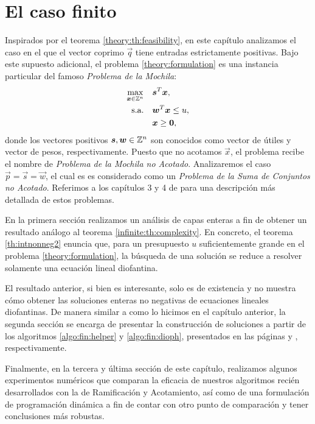 \chapter{El caso finito}
\noindent
Inspirados por el teorema \ref{theory:th:feasibility}, en este capítulo analizamos el caso en el que
el vector coprimo $\vec{q}$ tiene entradas estrictamente positivas. Bajo este supuesto adicional, el
problema \eqref{theory:formulation} es una instancia particular del famoso \emph{Problema de la
Mochila}:
\begin{subequations}
	\label{knapsack-formulation}
	\begin{align}
		\max_{\boldsymbol{x} \in \mathbb{Z}^n} \quad
			& \boldsymbol{s}^T\boldsymbol{x}, \\
		\text{s.a.} \quad
			& \boldsymbol{w}^T\boldsymbol{x} \leq u, \\
			& \boldsymbol{x} \geq \boldsymbol{0},
	\end{align}
\end{subequations}
donde los vectores positivos $\boldsymbol{s}, \boldsymbol{w} \in \mathbb{Z}^n$ son conocidos como vector de útiles y
vector de pesos, respectivamente. Puesto que no acotamos $\vec{x}$, el problema recibe el nombre de
\emph{Problema de la Mochila no Acotado}. Analizaremos el caso $\vec{p} = \vec{s} = \vec{w}$, el cual es es
considerado como un \emph{Problema de la Suma de Conjuntos no Acotado}. Referimos a los capítulos 3 y 4 de
\cite{martello} para una descripción más detallada de estos problemas.

En la primera sección realizamos un análisis de capas enteras a fin de obtener un resultado análogo
al teorema \ref{infinite:th:complexity}. En concreto, el teorema \ref{th:intnonneg2} enuncia que,
para un presupuesto $u$ suficientemente grande en el problema \eqref{theory:formulation}, la
búsqueda de una solución se reduce a resolver solamente una ecuación lineal diofantina.

El resultado anterior, si bien es interesante, solo es de existencia y no muestra cómo obtener las
soluciones enteras no negativas de ecuaciones lineales diofantinas. De manera similar a como lo
hicimos en el capítulo anterior, la segunda sección se encarga de presentar la construcción de
soluciones a partir de los algoritmos \ref{algo:fin:helper} y \ref{algo:fin:dioph}, presentados en
las páginas \pageref{algo:fin:helper} y \pageref{algo:fin:dioph}, respectivamente.

Finalmente, en la tercera y última sección de este capítulo, realizamos algunos experimentos
numéricos que comparan la eficacia de nuestros algoritmos recién desarrollados con la de
Ramificación y Acotamiento, así como de una formulación de programación dinámica a fin de contar con
otro punto de comparación y tener conclusiones más robustas.

